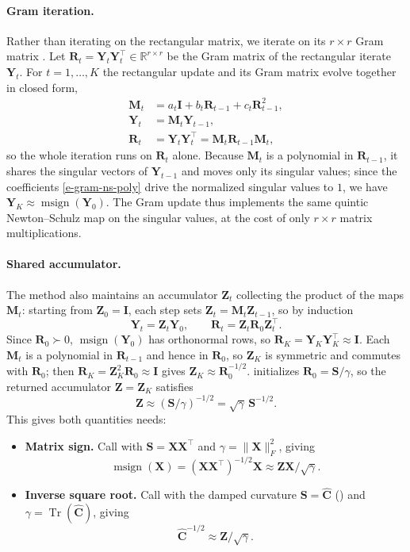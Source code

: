 \documentclass[11pt]{article}
\newcommand{\mat}[1]{\bm{#1}}
\DeclareMathOperator{\Tr}{Tr}
\DeclareMathOperator{\msign}{msign}          %
\newcommand{\norm}[1]{\| #1\|}
\begin{document}
\paragraph{Gram iteration.}
Rather than iterating on the rectangular matrix, we iterate on its $r\times r$
Gram matrix \cite{gram_ns}.  Let $\mat{R}_t = \mat{Y}_t \mat{Y}_t^\top \in \mathbb{R}^{r\times r}$
be the Gram matrix of the rectangular iterate $\mat{Y}_t$.  For $t=1,\dots,K$ the
rectangular update and its Gram matrix evolve together in closed form,
\[
\begin{aligned}
    \mat{M}_t &= a_t \mat{I} + b_t \mat{R}_{t-1} + c_t \mat{R}_{t-1}^2, \\
    \mat{Y}_t &= \mat{M}_t \mat{Y}_{t-1}, \\
    \mat{R}_t &= \mat{Y}_t\mat{Y}_t^\top = \mat{M}_t \mat{R}_{t-1} \mat{M}_t ,
\end{aligned}
\]
so the whole iteration runs on $\mat{R}_t$ alone.  Because $\mat{M}_t$ is a polynomial in
$\mat{R}_{t-1}$, it shares the singular vectors of $\mat{Y}_{t-1}$ and moves only its
singular values; since the coefficients \eqref{e-gram-ns-poly} drive the
normalized singular values to $1$, we have $\mat{Y}_K \approx \msign(\mat{Y}_0)$.  The Gram update thus
implements the same quintic Newton--Schulz map on the singular values, at the
cost of only $r\times r$ matrix multiplications.

\paragraph{Shared accumulator.}
The method also maintains an accumulator $\mat{Z}_t$ collecting the product of the
maps $\mat{M}_t$: starting from $\mat{Z}_0=\mat{I}$, each step sets $\mat{Z}_t=\mat{M}_t \mat{Z}_{t-1}$, so by
induction
\[
    \mat{Y}_t=\mat{Z}_t\mat{Y}_0,
    \qquad
    \mat{R}_t=\mat{Z}_t\mat{R}_0\mat{Z}_t^\top .
\]
Since $\mat{R}_0\succ0$, $\msign(\mat{Y}_0)$ has orthonormal rows, so
$\mat{R}_K=\mat{Y}_K\mat{Y}_K^\top\approx \mat{I}$.  Each $\mat{M}_t$ is a polynomial in $\mat{R}_{t-1}$ and
hence in $\mat{R}_0$, so $\mat{Z}_K$ is symmetric and commutes with $\mat{R}_0$; then
$\mat{R}_K=\mat{Z}_K^2\mat{R}_0\approx \mat{I}$ gives $\mat{Z}_K\approx \mat{R}_0^{-1/2}$.
 initializes $\mat{R}_0=\mat{S}/\gamma$, so the returned accumulator
$\mat{Z}=\mat{Z}_K$ satisfies
\[
    \mat{Z}\approx(\mat{S}/\gamma)^{-1/2}=\sqrt{\gamma}\,\mat{S}^{-1/2}.
\]
This gives both quantities  needs:

\begin{itemize}[leftmargin=1.5em,itemsep=2pt,topsep=2pt]
    \item \textbf{Matrix sign.}
    Call  with $\mat{S}=\mat{X}\mat{X}^\top$ and $\gamma=\norm{\mat{X}}_F^2$, giving
    \[
        \msign(\mat{X})=(\mat{X}\mat{X}^\top)^{-1/2}\mat{X}\approx \mat{Z}\mat{X}/\sqrt{\gamma}.
    \]
    \item \textbf{Inverse square root.}
    Call  with the damped curvature $\mat{S}=\widehat{\mat{C}}$
    () and $\gamma=\Tr(\widehat{\mat{C}})$, giving
    \[
        \widehat{\mat{C}}^{-1/2}\approx \mat{Z}/\sqrt{\gamma}.
    \]
\end{itemize}
\end{document}
